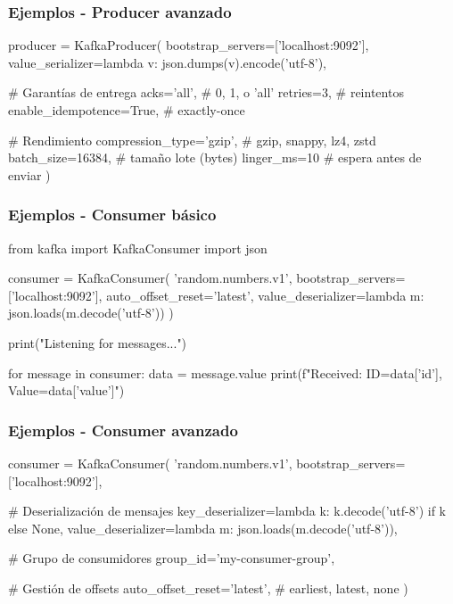 \documentclass[aspectratio=169]{beamer}
\begin{document}
\begin{frame}[fragile]\frametitle{Ejemplos - Producer avanzado}
\begin{code}
\begin{python3code}
producer = KafkaProducer(
    bootstrap_servers=['localhost:9092'],
    value_serializer=lambda v: json.dumps(v).encode('utf-8'),

    # Garantías de entrega
    acks='all',              # 0, 1, o 'all'
    retries=3,               # reintentos
    enable_idempotence=True, # exactly-once

    # Rendimiento
    compression_type='gzip', # gzip, snappy, lz4, zstd
    batch_size=16384,        # tamaño lote (bytes)
    linger_ms=10             # espera antes de enviar
)
\end{python3code}
\end{code}
\end{frame}


\begin{frame}[fragile]\frametitle{Ejemplos - Consumer básico}
\begin{code}
\begin{python3code}
from kafka import KafkaConsumer
import json

consumer = KafkaConsumer(
    'random.numbers.v1',
    bootstrap_servers=['localhost:9092'],
    auto_offset_reset='latest',
    value_deserializer=lambda m: json.loads(m.decode('utf-8'))
)

print("Listening for messages...")

for message in consumer:
    data = message.value
    print(f"Received: ID={data['id']}, Value={data['value']}")
\end{python3code}
\end{code}
\end{frame}


\begin{frame}[fragile]\frametitle{Ejemplos - Consumer avanzado}
\begin{code}
\begin{python3code}
consumer = KafkaConsumer(
    'random.numbers.v1',
    bootstrap_servers=['localhost:9092'],

    # Deserialización de mensajes
    key_deserializer=lambda k: k.decode('utf-8') if k else None,
    value_deserializer=lambda m: json.loads(m.decode('utf-8')),

    # Grupo de consumidores
    group_id='my-consumer-group',

    # Gestión de offsets
    auto_offset_reset='latest',    # earliest, latest, none
)
\end{python3code}
\end{code}
\end{frame}
\end{document}
